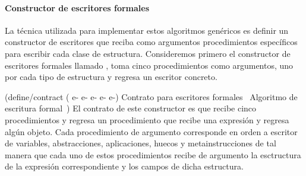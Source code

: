\documentclass[letterpaper, twoside, openright, 11pt]{book}%
\begin{document}
\paragraph{Constructor de escritores formales} La técnica utilizada para implementar estos algoritmos genéricos es definir un constructor de escritores que reciba como argumentos procedimientos específicos para escribir cada clase de estructura. Consideremos primero el constructor de escritores formales llamado {\Tt{}\nwendquote}, toma cinco procedimientos como argumentos, uno por cada tipo de estructura y regresa un escritor concreto.

\nwenddocs{}\endmoddef\nwstartdeflinemarkup{}\nwenddeflinemarkup
(define/contract ( e- e- e-
                                  e- e-)
  \LA{}Contrato para escritores formales~{\nwtagstyle{}}\RA{}
  \LA{}Algoritmo de escritura formal~{\nwtagstyle{}}\RA{})
\eatline
{}\nwendcode{}\nwdocspar
El contrato de este constructor es que recibe cinco procedimientos y regresa un procedimiento que recibe una expresión y regresa algún objeto. Cada procedimiento de argumento corresponde en orden a escritor de variables, abstracciones, aplicaciones, huecos y metainstrucciones de tal manera que cada uno de estos procedimientos recibe de argumento la esctructura de la expresión correspondiente y los campos de dicha estructura.
\end{document}
